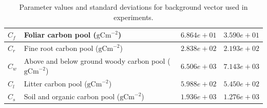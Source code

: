 \documentclass[11pt]{article}
\begin{document}
\begin{table}[ht]
\begin{center}
\begin{tabular}{| l | l | l | l |}
$C_{f}$ & Foliar carbon pool ($\text{gCm}^{-2}$) & $6.864e+01$ & $3.590e+01$  \\ \hline
$C_{r}$ & Fine root carbon pool ($\text{gCm}^{-2}$) & $2.838e+02$ & $2.193e+02$  \\ \hline
$C_{w}$ & Above and below ground woody carbon pool ($\text{gCm}^{-2}$) & $6.506e+03$ & $7.143e+03$  \\ \hline
$C_{l}$ & Litter carbon pool ($\text{gCm}^{-2}$) & $5.988e+02$ & $5.450e+02$ \\ \hline
$C_{s}$ & Soil and organic carbon pool ($\text{gCm}^{-2}$) & $1.936e+03$ & $1.276e+03$  \\ \hline
	\end{tabular}
	\caption{Parameter values and standard deviations for background vector used in experiments.}
	\label{table:xbvars}
\end{center} 
\end{table}
\end{document}
